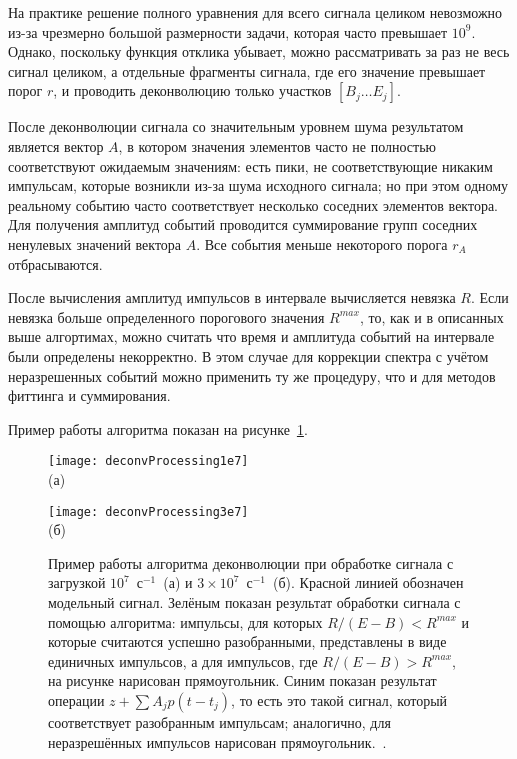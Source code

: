 На практике решение полного уравнения для всего сигнала целиком невозможно из-за чрезмерно большой размерности задачи, которая часто превышает $10^9$. Однако, поскольку функция отклика убывает, можно рассматривать за раз не весь сигнал целиком, а отдельные фрагменты сигнала, где его значение превышает порог $r$, и проводить деконволюцию только участков $\left[ B_j \ldots E_j \right] $.~\cite{Khilkevitch2020} 

После деконволюции сигнала со значительным уровнем шума результатом является вектор $A$, в котором значения элементов часто не полностью соответствуют ожидаемым значениям: есть пики, не соответствующие никаким импульсам, которые возникли из-за шума исходного сигнала; но при этом одному реальному событию часто соответствует несколько соседних элементов вектора. Для получения амплитуд событий проводится суммирование групп соседних ненулевых значений вектора $A$. Все события меньше некоторого порога $r_A$ отбрасываются.

После вычисления амплитуд импульсов в интервале вычисляется невязка $R$. Если невязка больше определенного порогового значения $R^{max}$, то, как и в описанных выше алгортимах, можно считать что время и амплитуда событий на интервале были определены некорректно. В этом случае для коррекции спектра с учётом неразрешенных событий можно применить ту же процедуру, что и для методов фиттинга и суммирования.~\cite{Khilkevitch2020}

Пример работы алгоритма показан на рисунке~\ref{fig:DeconvProcessing}.

\begin{figure}[ht]
    \begin{minipage}[b][][b]{0.95\linewidth}\centering
      \texttt{[image: deconvProcessing1e7]} \\ (а)
    \end{minipage}
    \vfill
    \begin{minipage}[b][][b]{0.95\linewidth}\centering
      \texttt{[image: deconvProcessing3e7]} \\ (б)
    \end{minipage}
    \vspace{5mm}
    \caption{ Пример работы алгоритма деконволюции при обработке сигнала с загрузкой $10^7$~с${}^{-1}$~(а) и $3 \times 10^7$~с${}^{-1}$~(б). Красной линией обозначен модельный сигнал. Зелёным показан результат обработки сигнала с помощью алгоритма: импульсы, для которых $R/(E-B)<R^{max}$ и которые считаются успешно разобранными, представлены в виде единичных импульсов, а для импульсов, где $R/(E-B)>R^{max}$, на рисунке нарисован прямоугольник. Синим показан результат операции $z + \sum A_j p(t - t_j)$, то есть это такой сигнал, который соответствует разобранным импульсам; аналогично, для неразрешённых импульсов нарисован прямоугольник.~\cite{Khilkevitch2020}. }
    \label{fig:DeconvProcessing}
\end{figure}

